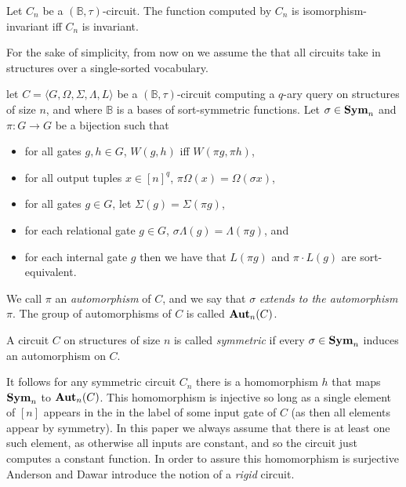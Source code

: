 \documentclass[../paper.tex]{subfiles}
\begin{document}
\begin{lem}
  Let $C_n$ be a $(\mathbb{B}, \tau)$-circuit. The function computed by $C_n$ is
  isomorphism-invariant iff $C_n$ is invariant.
\end{lem}

For the sake of simplicity, from now on we assume the that all circuits take in
structures over a single-sorted vocabulary.

\begin{definition}[Automorphism]
  let $C = \langle G, \Omega, \Sigma, \Lambda, L\rangle$ be a
  $(\mathbb{B},\tau)$-circuit computing a $q$-ary query on structures of size
  $n$, and where $\mathbb{B}$ is a bases of sort-symmetric functions. Let
  $\sigma \in \text{\textbf{Sym}}_n$ and $\pi: G \rightarrow G$ be a bijection such that
  \begin{itemize}
    \setlength\itemsep{0mm}
  \item for all gates $g, h \in G$, $W(g,h)$ iff $W(\pi g, \pi h)$,
  \item for all output tuples $x \in [n]^q$, $\pi \Omega (x) = \Omega (\sigma
    x)$,
  \item for all gates $g \in G$, let $\Sigma (g) = \Sigma (\pi g)$,
  \item for each relational gate $g \in G$, $\sigma \Lambda (g) = \Lambda (\pi
    g)$, and
  \item for each internal gate $g$ then we have that $L(\pi g)$ and $ \pi \cdot
    L(g)$ are sort-equivalent.
  \end{itemize}
  We call $\pi$ an \emph{automorphism} of $C$, and we say that $\sigma$
  \emph{extends to the automorphism} $\pi$. The group of automorphisms of $C$ is
  called $\text{\textbf{Aut}}_n (C)$.
\end{definition}

\begin{definition}[Symmetry]
  A circuit $C$ on structures of size $n$ is called \emph{symmetric} if every
  $\sigma \in \text{\textbf{Sym}}_n$ induces an automorphism on $C$.
\end{definition}

It follows for any symmetric circuit $C_n$ there is a homomorphism $h$ that maps
$\text{\textbf{Sym}}_n$ to $\text{\textbf{Aut}}_n(C)$. This homomorphism is injective so long as a single
element of $[n]$ appears in the in the label of some input gate of $C$ (as then
all elements appear by symmetry)\cite{AndersonD17}. In this paper we always
assume that there is at least one such element, as otherwise all inputs are
constant, and so the circuit just computes a constant function. In order to
assure this homomorphism is surjective Anderson and Dawar \cite{AndersonD17}
introduce the notion of a \emph{rigid} circuit.
\end{document}
